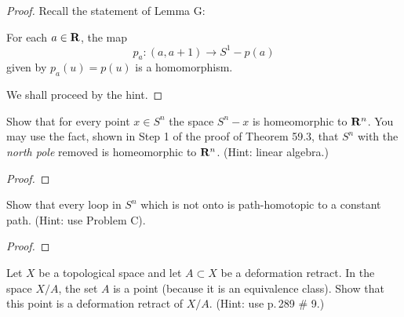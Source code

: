 \begin{proof}
Recall the statement of Lemma G:
\begin{lemma*}[G]
For each $a\in\mathbf{R}$, the map
\[
p_a\colon(a,a+1)\longrightarrow S^1-p(a)
\]
given by $p_a(u)=p(u)$ is a homomorphism.
\end{lemma*}
We shall proceed by the hint.
\end{proof}
\newpage
\begin{problem}[(C)]
Show that for every point $x\in S^n$ the space $S^n-x$ is homeomorphic to
$\mathbf{R}^n$. You may use the fact, shown in Step 1 of the proof of Theorem
59.3, that $S^n$ with the \emph{north pole} removed is homeomorphic to
$\mathbf{R}^n$. (Hint: linear algebra.)
\end{problem}
\begin{proof}
\end{proof}
\newpage
\begin{problem}[(D)]
Show that every loop in $S^n$ which is not onto is path-homotopic to a
constant path. (Hint: use Problem C).
\end{problem}
\begin{proof}
\end{proof}
\newpage
\begin{problem}[(E)]
Let $X$ be a topological space and let $A\subset X$ be a deformation
retract. In the space $X/A$, the set $A$ is a point (because it is an
equivalence class). Show that this point is a deformation retract of
$X/A$. (Hint: use p.\,289 \# 9.)
\end{problem}
